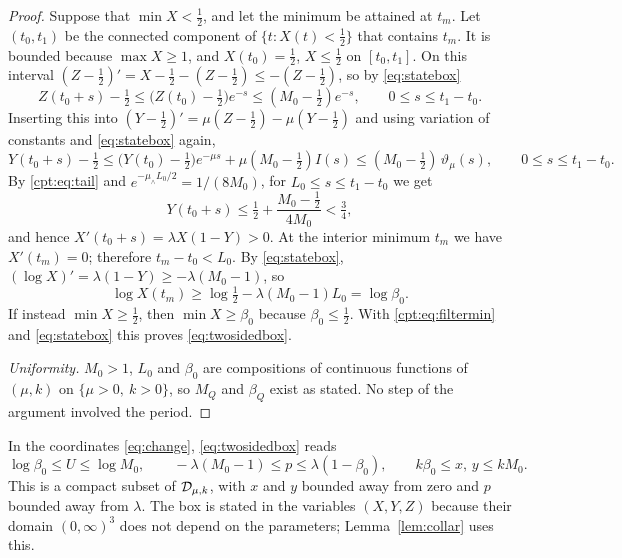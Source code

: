 \begin{proof}
Suppose that $\min X<\tfrac12$, and let the minimum be attained at $t_m$. Let $(t_0,t_1)$ be the connected component of $\{t:X(t)<\tfrac12\}$ that contains $t_m$. It is bounded because $\max X\ge1$, and $X(t_0)=\tfrac12$, $X\le\tfrac12$ on $[t_0,t_1]$. On this interval $(Z-\tfrac12)'=X-\tfrac12-(Z-\tfrac12)\le-(Z-\tfrac12)$, so by \eqref{eq:statebox}
\[
Z(t_0+s)-\tfrac12\le\bigl(Z(t_0)-\tfrac12\bigr)e^{-s}\le(M_0-\tfrac12)e^{-s},\qquad 0\le s\le t_1-t_0.
\]
Inserting this into $(Y-\tfrac12)'=\mu(Z-\tfrac12)-\mu(Y-\tfrac12)$ and using variation of constants and \eqref{eq:statebox} again,
\[
Y(t_0+s)-\tfrac12\le\bigl(Y(t_0)-\tfrac12\bigr)e^{-\mu s}+\mu(M_0-\tfrac12)I(s)\le(M_0-\tfrac12)\,\vartheta_\mu(s),\qquad 0\le s\le t_1-t_0.
\]
By \eqref{cpt:eq:tail} and $e^{-\mu_\wedge L_0/2}=1/(8M_0)$, for $L_0\le s\le t_1-t_0$ we get
\[
Y(t_0+s)\le\tfrac12+\frac{M_0-\tfrac12}{4M_0}<\tfrac34,
\]
and hence $X'(t_0+s)=\lambda X(1-Y)>0$. At the interior minimum $t_m$ we have $X'(t_m)=0$; therefore $t_m-t_0<L_0$. By \eqref{eq:statebox}, $(\log X)'=\lambda(1-Y)\ge-\lambda(M_0-1)$, so
\[
\log X(t_m)\ge\log\tfrac12-\lambda(M_0-1)L_0=\log\beta_0 .
\]
If instead $\min X\ge\tfrac12$, then $\min X\ge\beta_0$ because $\beta_0\le\tfrac12$. With \eqref{cpt:eq:filtermin} and \eqref{eq:statebox} this proves \eqref{eq:twosidedbox}.

\emph{Uniformity.} $M_0>1$, $L_0$ and $\beta_0$ are compositions of continuous functions of $(\mu,k)$ on $\{\mu>0,\ k>0\}$, so $M_Q$ and $\beta_Q$ exist as stated. No step of the argument involved the period.
\end{proof}
In the coordinates \eqref{eq:change}, \eqref{eq:twosidedbox} reads
\begin{equation}\label{cpt:eq:logbox}
\log\beta_0\le U\le\log M_0,\qquad
-\lambda(M_0-1)\le p\le\lambda(1-\beta_0),\qquad
k\beta_0\le x,\,y\le kM_0 .
\end{equation}
This is a compact subset of $\mathcal D_{\mu,k}$, with $x$ and $y$ bounded away from zero and $p$ bounded away from $\lambda$. The box is stated in the variables $(X,Y,Z)$ because their domain $(0,\infty)^3$ does not depend on the parameters; Lemma~\ref{lem:collar} uses this.

